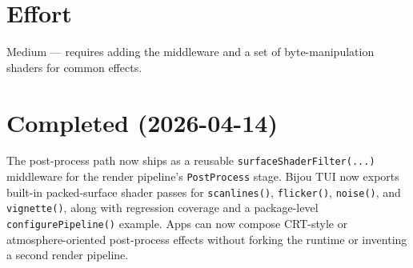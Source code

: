 \section{Effort}\label{record-288-effort}

Medium --- requires adding the middleware and a set of byte-manipulation shaders for common effects.

\section{Completed (2026-04-14)}\label{record-288-completed-2026-04-14}

The post-process path now ships as a reusable \texttt{s\allowbreak{}u\allowbreak{}r\allowbreak{}f\allowbreak{}a\allowbreak{}c\allowbreak{}e\allowbreak{}S\allowbreak{}h\allowbreak{}a\allowbreak{}d\allowbreak{}e\allowbreak{}r\allowbreak{}F\allowbreak{}i\allowbreak{}l\allowbreak{}t\allowbreak{}e\allowbreak{}r\allowbreak{}(\allowbreak{}.\allowbreak{}.\allowbreak{}.\allowbreak{})} middleware for the render pipeline's \texttt{P\allowbreak{}o\allowbreak{}s\allowbreak{}t\allowbreak{}P\allowbreak{}r\allowbreak{}o\allowbreak{}c\allowbreak{}e\allowbreak{}s\allowbreak{}s} stage. Bijou TUI now exports built-in packed-surface shader passes for \texttt{s\allowbreak{}c\allowbreak{}a\allowbreak{}n\allowbreak{}l\allowbreak{}i\allowbreak{}n\allowbreak{}e\allowbreak{}s\allowbreak{}(\allowbreak{})}, \texttt{f\allowbreak{}l\allowbreak{}i\allowbreak{}c\allowbreak{}k\allowbreak{}e\allowbreak{}r\allowbreak{}(\allowbreak{})}, \texttt{n\allowbreak{}o\allowbreak{}i\allowbreak{}s\allowbreak{}e\allowbreak{}(\allowbreak{})}, and \texttt{v\allowbreak{}i\allowbreak{}g\allowbreak{}n\allowbreak{}e\allowbreak{}t\allowbreak{}t\allowbreak{}e\allowbreak{}(\allowbreak{})}, along with regression coverage and a package-level \texttt{c\allowbreak{}o\allowbreak{}n\allowbreak{}f\allowbreak{}i\allowbreak{}g\allowbreak{}u\allowbreak{}r\allowbreak{}e\allowbreak{}P\allowbreak{}i\allowbreak{}p\allowbreak{}e\allowbreak{}l\allowbreak{}i\allowbreak{}n\allowbreak{}e\allowbreak{}(\allowbreak{})} example. Apps can now compose CRT-style or atmosphere-oriented post-process effects without forking the runtime or inventing a second render pipeline.

